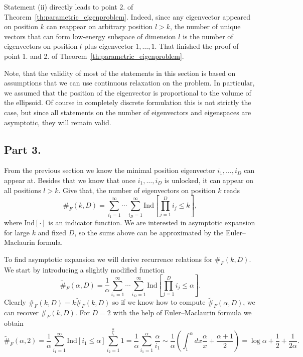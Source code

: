 \documentclass{article}
\begin{document}
Statement (ii) directly leads to point 2. of Theorem~\ref{th:parametric_eigenproblem}. Indeed, since any eigenvector appeared on position $k$ can reappear on arbitrary position $l > k$, the number of unique vectors that can form low-energy subspace of dimension $l$ is the number of eigenvectors on position $l$ plus eigenvector $1,\dots, 1$. That finished the proof of point 1. and 2. of Theorem~\ref{th:parametric_eigenproblem}.

Note, that the validity of most of the statements in this section is based on assumptions that we can use continuous relaxation on the problem. In particular, we assumed that the position of the eigenvector is proportional to the volume of the ellipsoid. Of course in completely discrete formulation this is not strictly the case, but since all statements on the number of eigenvectors and eigenspaces are asymptotic, they will remain valid.

\subsection{Part 3.}
From the previous section we know the minimal position eigenvector $i_1,\dots,i_D$ can appear at. Besides that we know that once $i_1,\dots, i_D$ is unlocked, it can appear on all positions $l>k$. Give that, the number of eigenvectors on position $k$ reads
\begin{equation}
	\#_{F}(k, D) = \sum_{i_1=1}^{\infty}\cdots\sum_{i_D=1}^{\infty} \text{Ind}\left[ \prod_{j=1}^{D} i_{j} \leq k\right],
\end{equation}
where $\text{Ind}[\cdot]$ is an indicator function. We are interested in asymptotic expansion for large $k$ and fixed $D$, so the sums above can be approximated by the Euler–Maclaurin formula.

To find asymptotic expansion we will derive recurrence relations for $\#_{F}(k, D)$. We start by introducing a slightly modified function
\begin{equation}
	\widetilde{\#}_{F}(\alpha, D) = \frac{1}{\alpha} \sum_{i_1=1}^{\infty}\cdots\sum_{i_D=1}^{\infty} \text{Ind}\left[ \prod_{j=1}^{D} i_{j} \leq  \alpha\right].
\end{equation}
Clearly $\#_{F}(k, D) = k\widetilde{\#}_{F}(k, D)$ so if we know how to compute $\widetilde{\#}_{F}(\alpha, D)$, we can recover $\#_{F}(k, D)$. For $D = 2$ with the help of Euler–Maclaurin formula we obtain
\begin{equation}
	\widetilde{\#}_{F}(\alpha, 2) = \frac{1}{\alpha}\sum_{i_1=1}^{\infty} \text{Ind}\left[i_1 \leq \alpha\right] \sum_{i_2=1}^{\frac{\alpha}{i_1}} 1 = \frac{1}{\alpha}\sum_{i_1=1}^{\alpha} \frac{\alpha}{i_1} \sim \frac{1}{\alpha}\left(\int_{1}^{\alpha}dx \frac{\alpha}{x} + \frac{\alpha + 1}{2}\right) = \log \alpha + \frac{1}{2} + \frac{1}{2\alpha}.
\end{equation}
\end{document}
